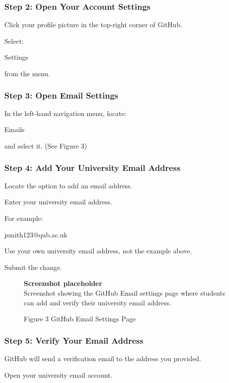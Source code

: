 \documentclass{csc2059practical}
\begin{document}
\subsubsection{Step 2: Open Your Account Settings}
Click your profile picture in the top-right corner of GitHub.

Select:

Settings

from the menu.

\subsubsection{Step 3: Open Email Settings}
In the left-hand navigation menu, locate:

Emails

and select it. (See Figure 3)

\subsubsection{Step 4: Add Your University Email Address}
Locate the option to add an email address.

Enter your university email address.

For example:

jsmith123@qub.ac.uk

Use your own university email address, not the example above.

Submit the change.


\begin{figure}[htbp]
\centering
\begin{tcolorbox}[
  enhanced,
  colback=CSCGray,
  colframe=CSCBlue!45!black,
  boxrule=0.6pt,
  arc=2mm,
  width=0.9\linewidth,
  left=5mm,right=5mm,top=5mm,bottom=5mm,
  halign=center
]
{\sffamily\bfseries Screenshot placeholder}\\[2mm]
{\small Screenshot showing the GitHub Email settings page where students can add and verify their university email address.}
\end{tcolorbox}
\caption{Figure 3 GitHub Email Settings Page}
\end{figure}
\subsubsection{Step 5: Verify Your Email Address}
GitHub will send a verification email to the address you provided.

Open your university email account.
\end{document}
